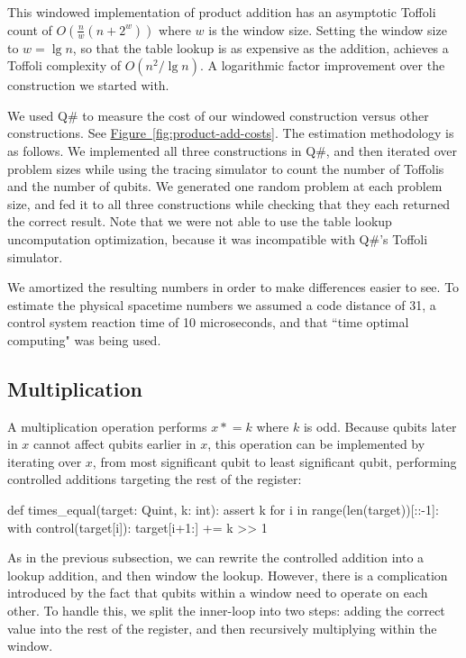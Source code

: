 \documentclass[onecolumn,unpublished]{quantumarticle}
\theoremstyle{definition}
\theoremstyle{definition}
\theoremstyle{definition}
\newcommand{\fig}[1]{\hyperref[fig:#1]{Figure~\ref*{fig:#1}}}
\newcommand{\timeseq}{\mathrel{\ast}=}
\begin{document}
This windowed implementation of product addition has an asymptotic Toffoli count of $O(\frac{n}{w} (n + 2^w))$ where $w$ is the window size.
Setting the window size to $w=\lg n$, so that the table lookup is as expensive as the addition, achieves a Toffoli complexity of $O(n^2/\lg n)$.
A logarithmic factor improvement over the construction we started with.

We used Q\# to measure the cost of our windowed construction versus other constructions.
See \fig{product-add-costs}.
The estimation methodology is as follows.
We implemented all three constructions in Q\#, and then iterated over problem sizes while using the tracing simulator to count the number of Toffolis and the number of qubits.
We generated one random problem at each problem size, and fed it to all three constructions while checking that they each returned the correct result.
Note that we were not able to use the table lookup uncomputation optimization, because it was incompatible with Q\#'s Toffoli simulator.

We amortized the resulting numbers in order to make differences easier to see.
To estimate the physical spacetime numbers we assumed a code distance of 31, a control system reaction time of 10 microseconds, and that ``time optimal computing" \cite{fowler2012time} was being used.


\subsection{Multiplication}

A multiplication operation performs $x \timeseq k$ where $k$ is odd.
Because qubits later in $x$ cannot affect qubits earlier in $x$, this operation can be implemented by iterating over $x$, from most significant qubit to least significant qubit, performing controlled additions targeting the rest of the register:

\begin{python}
    def times_equal(target: Quint, k: int):
        assert k %
        for i in range(len(target))[::-1]:
            with control(target[i]):
                target[i+1:] += k >> 1
\end{python}

As in the previous subsection, we can rewrite the controlled addition into a lookup addition, and then window the lookup.
However, there is a complication introduced by the fact that qubits within a window need to operate on each other.
To handle this, we split the inner-loop into two steps: adding the correct value into the rest of the register, and then recursively multiplying within the window.
\end{document}
